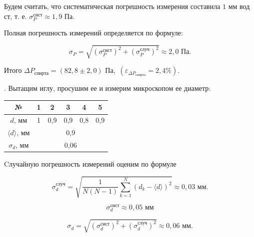 \documentclass[a4paper,12pt]{article} %
\begin{document}
{\medskip

\noindent Будем считать, что систематическая погрешность измерения составила $ 1 $ мм вод ст, т. е. {$ \sigma_{P}^\text{сист} \approx 1,9 $ Па}.

\medskip

\noindent Полная погрешность измерений определяется по формуле:

\begin{equation}
\sigma_{P}=\sqrt{(\sigma_{P}^\text{сист})^2 + (\sigma_{P}^\text{случ})^2} \approx 2,0 \text{ Па}.
\end{equation}

\medskip

\noindent Итого { $ \Delta P_{\text{спирта}} = (82,8 \pm 2,0) \text{ Па},$} \quad $(\varepsilon_{\Delta P_{\text{спирта}}} = 2,4 \%) $.

\medskip

. Вытащим иглу, просушим ее и измерим микроскопом ее диаметр:

\medskip

\begin{tabular}{|c|c|c|c|c|c|}
\hline 
№ & 1 & 2 & 3 & 4 & 5 \\ 
\hline 
$d$, мм & 1 & 0,9 & 0,9 & 0,8 & 0,9 \\ 
\hline 
$\langle d \rangle$, мм & \multicolumn{5}{c|}{0,9} \\ 
\hline 
$\sigma_{d}$, мм & \multicolumn{5}{c|}{0,06} \\ 
\hline 
\end{tabular} 

\medskip

\noindent Cлучайную погрешность измерений оценим по формуле

\medskip

\begin{equation}
\sigma_{d}^{\text{случ}} = \sqrt{\frac{1}{N(N-1)}\sum\limits_{k=1}^N\left(d_k-\langle d \rangle\right)^2} \approx 0,03 \text{ мм}.
\end{equation}

\medskip

\begin{equation}
\sigma_{d}^\text{сист} \approx 0,05 \text{ мм}
\end{equation}

\medskip

\begin{equation}
\sigma_{d}=\sqrt{(\sigma_{d}^\text{сист})^2 + (\sigma_{d}^\text{случ})^2} \approx 0,06 \text{ мм}.
\end{equation}

}
\end{document}
